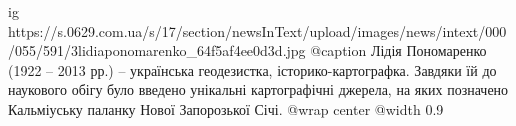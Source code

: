  
 
 
 
 

\ifcmt
  ig https://s.0629.com.ua/s/17/section/newsInText/upload/images/news/intext/000/055/591/3lidiaponomarenko_64f5af4ee0d3d.jpg
	@caption Лідія Пономаренко (1922 – 2013 рр.) – українська геодезистка, історико-картографка. Завдяки їй до наукового обігу було введено унікальні картографічні джерела, на яких позначено Кальміуську паланку Нової Запорозької Січі.
  @wrap center
  @width 0.9
\fi
